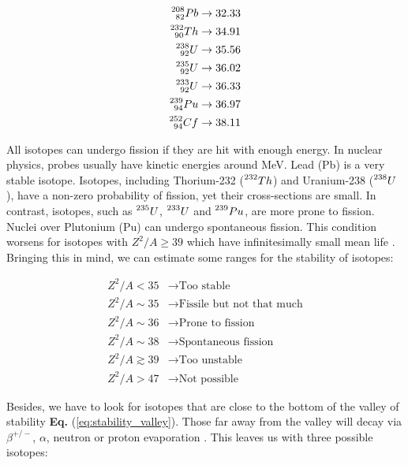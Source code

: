 \begin{align*}
    \prescript{208}{82}{Pb} \rightarrow 32.33\\
    \prescript{232}{90}{Th} \rightarrow 34.91\\
    \prescript{238}{92}{U} \rightarrow  35.56\\
    \prescript{235}{92}{U} \rightarrow 36.02\\
    \prescript{233}{92}{U} \rightarrow 36.33\\
    \prescript{239}{94}{Pu} \rightarrow 36.97\\
    \prescript{252}{94}{Cf} \rightarrow 38.11
\end{align*}

All isotopes can undergo fission if they are hit with enough energy. In nuclear physics, probes usually have kinetic energies around MeV. Lead (Pb) is a very stable isotope. Isotopes, including Thorium-232 ($\prescript{232}{}{Th}$) and Uranium-238 ($\prescript{238}{}{U}$), have a non-zero probability of fission, yet their cross-sections are small. In contrast, isotopes, such as $\prescript{235}{}{U}$, $\prescript{233}{}{U}$ and $\prescript{239}{}{Pu}$, are more prone to fission. Nuclei over Plutonium (Pu) can undergo spontaneous fission. This condition worsens for isotopes with $Z^2/A \geq 39$ which have infinitesimally small mean life \cite{Notas_sanabricas}. Bringing this in mind, we can estimate some ranges for the stability of isotopes:
\begin{center}
\begin{align*}
    Z^2/A < 35 &\rightarrow \text{Too stable}\\
    Z^2/A \sim 35 &\rightarrow \text{Fissile but not that much}\\
    Z^2/A \sim 36 &\rightarrow \text{Prone to fission}\\
    Z^2/A \sim 38 &\rightarrow \text{Spontaneous fission}\\
    Z^2/A  \gtrsim 39 &\rightarrow \text{Too unstable} \\
    Z^2/A > 47 &\rightarrow \text{Not possible}
\end{align*}
\end{center}

Besides, we have to look for isotopes that are close to the bottom of the valley of stability \textbf{Eq.} (\ref{eq:stability_valley}). Those far away from the valley will decay via $\beta^{+/-}$, $\alpha$, neutron or proton evaporation \cite{Notas_sanabricas}. This leaves us with three possible isotopes:

